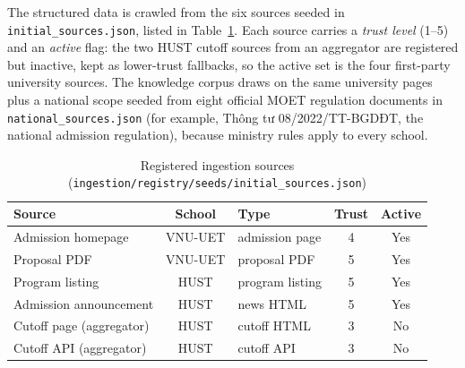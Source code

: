 \documentclass[../main.tex]{subfiles}
\begin{document}
The structured data is crawled from the six sources seeded in \texttt{initial\_sources.json}, listed in Table~\ref{table:sources}.
Each source carries a \textit{trust level} (1--5) and an \textit{active} flag: the two HUST cutoff sources from an aggregator are registered but inactive, kept as lower-trust fallbacks, so the active set is the four first-party university sources.
The knowledge corpus draws on the same university pages plus a national scope seeded from eight official \gls{MOET} regulation documents in \texttt{national\_sources.json} (for example, Thông tư 08/2022/TT-BGDĐT, the national admission regulation), because ministry rules apply to every school.

\begin{table}[H]
    \centering
    \caption{Registered ingestion sources (\texttt{ingestion/registry/seeds/initial\_sources.json})}
    \label{table:sources}
    {\footnotesize
    \setlength{\tabcolsep}{5pt}
    \begin{tabular}{|p{4.3cm}|c|p{3.2cm}|c|c|}
        \hline
        \textbf{Source} & \textbf{School} & \textbf{Type} & \textbf{Trust} & \textbf{Active} \\
        \hline
        Admission homepage & \gls{VNU-UET} & admission page & 4 & Yes \\
        \hline
        Proposal \gls{PDF} & \gls{VNU-UET} & proposal \gls{PDF} & 5 & Yes \\
        \hline
        Program listing & \gls{HUST} & program listing & 5 & Yes \\
        \hline
        Admission announcement & \gls{HUST} & news \gls{HTML} & 5 & Yes \\
        \hline
        Cutoff page (aggregator) & \gls{HUST} & cutoff \gls{HTML} & 3 & No \\
        \hline
        Cutoff \gls{API} (aggregator) & \gls{HUST} & cutoff \gls{API} & 3 & No \\
        \hline
    \end{tabular}}
\end{table}
\end{document}
